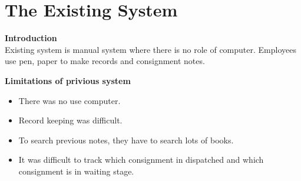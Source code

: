 \section{The Existing System}
{\bf Introduction }\\
Existing system is manual system where there is no role of computer. 
Employees use pen, paper to make records and consignment notes.

{\bf {Limitations of privious system }}
\begin{itemize}
\item There was no use computer.

\item Record keeping was difficult.

\item To search previous notes, they have to search lots of books.

\item It was difficult to track which consignment in dispatched and
which consignment is in waiting stage.

\end{itemize}



